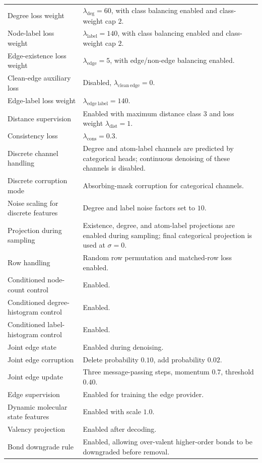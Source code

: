 \begin{table}[p]
\begin{tabularx}{\textwidth}{@{}p{}X@{}}
Degree loss weight & \(\lambda_{\mathrm{deg}}=60\), with class balancing enabled and class-weight cap \(2\). \\
Node-label loss weight & \(\lambda_{\mathrm{label}}=140\), with class balancing enabled and class-weight cap \(2\). \\
Edge-existence loss weight & \(\lambda_{\mathrm{edge}}=5\), with edge/non-edge balancing enabled. \\
Clean-edge auxiliary loss & Disabled, \(\lambda_{\mathrm{clean\ edge}}=0\). \\
Edge-label loss weight & \(\lambda_{\mathrm{edge\ label}}=140\). \\
Distance supervision & Enabled with maximum distance class \(3\) and loss weight \(\lambda_{\mathrm{dist}}=1\). \\
Consistency loss & \(\lambda_{\mathrm{cons}}=0.3\). \\
Discrete channel handling & Degree and atom-label channels are predicted by categorical heads; continuous denoising of these channels is disabled. \\
Discrete corruption mode & Absorbing-mask corruption for categorical channels. \\
Noise scaling for discrete features & Degree and label noise factors set to \(10\). \\
Projection during sampling & Existence, degree, and atom-label projections are enabled during sampling; final categorical projection is used at \(\sigma=0\). \\
Row handling & Random row permutation and matched-row loss enabled. \\
Conditioned node-count control & Enabled. \\
Conditioned degree-histogram control & Enabled. \\
Conditioned label-histogram control & Enabled. \\
Joint edge state & Enabled during denoising. \\
Joint edge corruption & Delete probability \(0.10\), add probability \(0.02\). \\
Joint edge update & Three message-passing steps, momentum \(0.7\), threshold \(0.40\). \\
Edge supervision & Enabled for training the edge provider. \\
Dynamic molecular state features & Enabled with scale \(1.0\). \\
Valency projection & Enabled after decoding. \\
Bond downgrade rule & Enabled, allowing over-valent higher-order bonds to be downgraded before removal. \\

\end{tabularx}
\end{table}
